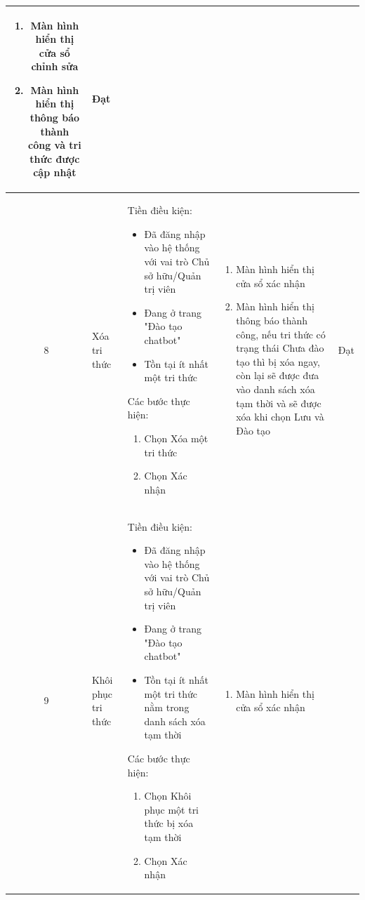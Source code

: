 \begin{longtable}{|c|m{2.5cm}|m{5.5cm}|m{4.5cm}|c|}
\begin{enumerate}[label=\arabic*.]
        \item Màn hình hiển thị cửa sổ chỉnh sửa
        \item Màn hình hiển thị thông báo thành công và tri thức được cập nhật 
    \end{enumerate}  & Đạt \\
    \hline
    8 & 
    Xóa tri thức & 
    Tiền điều kiện:
    \begin{itemize}
        \item Đã đăng nhập vào hệ thống với vai trò Chủ sở hữu/Quản trị viên
        \item Đang ở trang "Đào tạo chatbot"
        \item Tồn tại ít nhất một tri thức
    \end{itemize}
    Các bước thực hiện: 
    \begin{enumerate}[label=\arabic*.]
        \item Chọn Xóa một tri thức
        \item Chọn Xác nhận
    \end{enumerate}
    & 
    \begin{enumerate}[label=\arabic*.]
        \item Màn hình hiển thị cửa sổ xác nhận
        \item Màn hình hiển thị thông báo thành công, nếu tri thức có trạng thái Chưa đào tạo thì bị xóa ngay, còn lại sẽ được đưa vào danh sách xóa tạm thời và sẽ được xóa khi chọn Lưu và Đào tạo 
    \end{enumerate}  & Đạt \\
    \hline
    9 & 
    Khôi phục tri thức & 
    Tiền điều kiện:
    \begin{itemize}
        \item Đã đăng nhập vào hệ thống với vai trò Chủ sở hữu/Quản trị viên
        \item Đang ở trang "Đào tạo chatbot"
        \item Tồn tại ít nhất một tri thức nằm trong danh sách xóa tạm thời
    \end{itemize}
    Các bước thực hiện: 
    \begin{enumerate}[label=\arabic*.]
        \item Chọn Khôi phục một tri thức bị xóa tạm thời
        \item Chọn Xác nhận
    \end{enumerate}
    & 
    \begin{enumerate}[label=\arabic*.]
        \item Màn hình hiển thị cửa sổ xác nhận

\end{enumerate}
\end{longtable}
